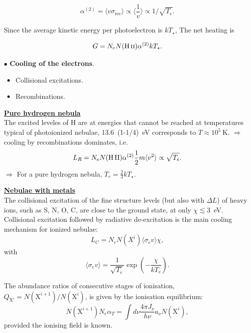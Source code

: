 \[
\alpha^{(2)} =  \langle v \sigma_\mathrm{rec} \rangle \propto
 \langle  \frac{1}{v}   \rangle \propto 1/\sqrt{T_e}.
\]

Since the average kinetic energy per photoelectron is $kT_\star$, The
net heating is 

\[
G =  N_e N(\text{H\,{\sc ii}}) \alpha^{(2)} kT_\star .
\]



$\bullet$ {\bf \large Cooling of the electrons}.

\begin{itemize}
\item Collisional excitations.
\item Recombinations.
\end{itemize}



\underline{\bf Pure hydrogen nebula}\\

The excited leveles of H are at energies that cannot be reached at
temperatures typical of photoionized nebulae, 13.6~(1-1/4)~eV
corresponds to  $T\approx 10^5~$K. $\Rightarrow$ cooling by
recombinations dominates, i.e. \[ L_R = N_e N(\mathrm{H\,{\small II}}) \alpha^{(2)} \frac{1}{2} m \langle v^2 \rangle \propto
\sqrt{T_e}.
\]
$\Rightarrow$ For a pure hydrogen nebula, $T_e = \frac{2}{3}
k T_\star$. 




\underline{\bf Nebulae with metals}\\

The collisional excitation of the fine structure levels (but also with
$\Delta L$) of heavy ions, such as S, N, O, C, are close to the ground
state, at only $\chi
\lesssim 3$~eV. Collisional excitation followed by radiative
de-excitation is the main cooling mechanism for ionized nebulae:
\[
L_C = N_e N(X^i) \langle \sigma_e v \rangle  \chi, 
\]
with
\[
\langle \sigma_e v \rangle  =  \frac{1}{\sqrt{T_e}} \exp( - \frac{\chi}{kT_e}). \]




The abundance ratios of consecutive stages of ionisation,
$Q_{\mathrm{X}^{i}}=N(\mathrm{X}^{i+1})/N(\mathrm{X}^{i})$, is given
by the ionisation equilibrium:
\begin{equation}
N(\mathrm{X}^{i+1}) N_{e} \alpha_{T} = {\int}d{\nu} \frac{4\pi J_{\nu}}{h\nu}
a_{\nu} N(\mathrm{X}^{i}), 
\end{equation}
provided the ionising field is known. 
  

